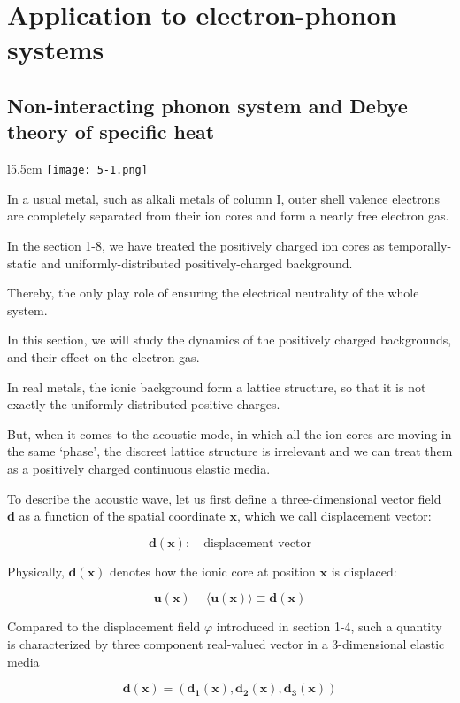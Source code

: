 \chapter{Application to electron-phonon systems}

\section{Non-interacting phonon system and Debye theory of specific heat}

\begin{wrapfigure}{l}{5.5cm}
\texttt{[image: 5-1.png]}
\end{wrapfigure}

In a usual metal, such as alkali metals of column I, outer shell valence electrons are completely separated from their ion cores and form a nearly free electron gas.

In the section 1-8, we have treated the positively charged ion cores as temporally-static and uniformly-distributed positively-charged background.

Thereby, the only play role of ensuring the electrical neutrality of the whole system.

In this section, we will study the dynamics of the positively charged backgrounds, and their effect on the electron gas.

In real metals, the ionic background form a lattice structure, so that it is not exactly the uniformly distributed positive charges.

But, when it comes to the acoustic mode, in which all the ion cores are moving in the same `phase', the discreet lattice structure is irrelevant and we can treat them as a positively charged continuous elastic media.

To describe the acoustic wave, let us first define a three-dimensional vector field $\bm d$ as a function of the spatial coordinate $\bm x$, which we call displacement vector:

\[\bm{d}(\bm{x}):\quad\text{displacement vector} \]

Physically, $\bm{d(x)}$ denotes how the ionic core at position $\bm x$ is displaced:

\[\bm{u(x) - \langle u(x)\rangle \equiv d(x)} \]

Compared to the displacement field $\varphi$ introduced in section 1-4, such a quantity is characterized by three component real-valued vector in a $3$-dimensional elastic media

\[\bm{d(x) = (d_1(x),d_2(x),d_3(x))} \]

